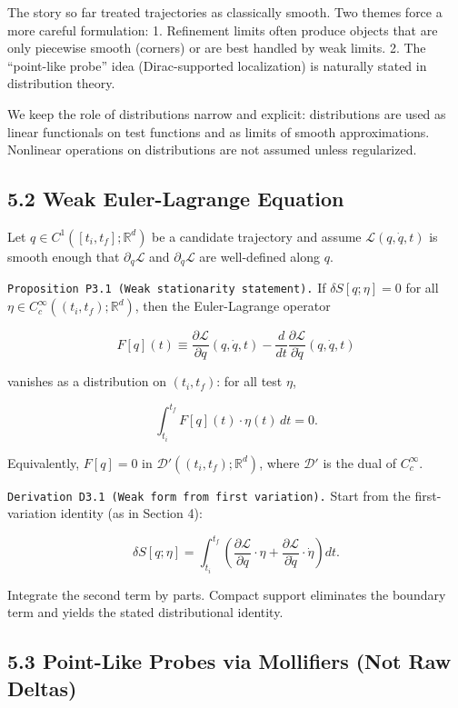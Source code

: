 \documentclass[
]{article}
\begin{document}
The story so far treated trajectories as classically smooth. Two themes
force a more careful formulation: 1. Refinement limits often produce
objects that are only piecewise smooth (corners) or are best handled by
weak limits. 2. The ``point-like probe'' idea (Dirac-supported
localization) is naturally stated in distribution theory.

We keep the role of distributions narrow and explicit: distributions are
used as linear functionals on test functions and as limits of smooth
approximations. Nonlinear operations on distributions are not assumed
unless regularized.

\hypertarget{weak-euler-lagrange-equation}{%
\subsection{5.2 Weak Euler-Lagrange
Equation}\label{weak-euler-lagrange-equation}}

Let \(q\in C^1([t_i,t_f];\mathbb R^d)\) be a candidate trajectory and
assume \(\mathcal L(q,\dot q,t)\) is smooth enough that
\(\partial_q\mathcal L\) and \(\partial_{\dot q}\mathcal L\) are
well-defined along \(q\).

\texttt{Proposition\ P3.1\ (Weak\ stationarity\ statement).} If
\(\delta S[q;\eta]=0\) for all
\(\eta\in C_c^\infty((t_i,t_f);\mathbb R^d)\), then the Euler-Lagrange
operator

\[
F[q](t)\equiv \frac{\partial\mathcal L}{\partial q}(q,\dot q,t)
-\frac{d}{dt}\frac{\partial\mathcal L}{\partial\dot q}(q,\dot q,t)
\]

vanishes as a distribution on \((t_i,t_f)\): for all test \(\eta\),

\[
\int_{t_i}^{t_f} F[q](t)\cdot\eta(t)\,dt=0.
\]

Equivalently, \(F[q]=0\) in \(\mathcal D'((t_i,t_f);\mathbb R^d)\),
where \(\mathcal D'\) is the dual of \(C_c^\infty\).

\texttt{Derivation\ D3.1\ (Weak\ form\ from\ first\ variation).} Start
from the first-variation identity (as in Section 4):

\[
\delta S[q;\eta]
=\int_{t_i}^{t_f}\left(
\frac{\partial\mathcal L}{\partial q}\cdot\eta
+
\frac{\partial\mathcal L}{\partial\dot q}\cdot\dot\eta
\right)dt.
\]

Integrate the second term by parts. Compact support eliminates the
boundary term and yields the stated distributional identity.

\hypertarget{point-like-probes-via-mollifiers-not-raw-deltas}{%
\subsection{5.3 Point-Like Probes via Mollifiers (Not Raw
Deltas)}\label{point-like-probes-via-mollifiers-not-raw-deltas}}
\end{document}
